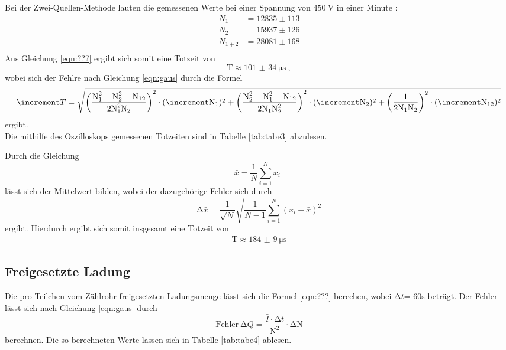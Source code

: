 Bei der Zwei-Quellen-Methode lauten die gemessenen Werte bei einer Spannung von
$\SI{450}{\volt}$ in einer Minute :
\begin{align*}
  N_1 &= 12835 \pm 113 \\
  N_2 &= 15937 \pm 126 \\
  N_{1+2} &= 28081 \pm 168 \\
\end{align*}
Aus Gleichung \ref{eqn:???} ergibt sich somit eine Totzeit von
\begin{equation*}
  \text{T} \approx \SI{101(34)}{\micro\second} \: ,
\end{equation*}
wobei sich der Fehlre nach Gleichung \ref{eqn:gaus} durch die Formel
\begin{equation}
  \increment T = \sqrt{\left( \frac{\text{N}_{1}^2-\text{N}_{2}^2-\text{N}_{12}}{2\text{N}_{1}^2\text{N}_{2}} \right)^2 \cdot (\increment \text{N}_{1})^2 \\
   + \left( \frac{\text{N}_{2}^2-\text{N}_{1}^2-\text{N}_{12}}{2\text{N}_{1}\text{N}_{2}^2} \right)^2 \cdot (\increment \text{N}_{2})^2
  +\left( \frac{1}{2\text{N}_{1}\text{N}_{2}} \right)^2 \cdot (\increment \text{N}_{12})^2 }
\end{equation}
ergibt. \\
Die mithilfe des Oszilloskops gemessenen Totzeiten sind in Tabelle \ref{tab:tabe3}
abzulesen.

Durch die Gleichung
\begin{equation}
  \bar{x} = \frac{1}{N} \sum_{i=1}^{N} x_i \: \:
  \label{eqn:mit}
\end{equation}
\noindent lässt sich der Mittelwert bilden, wobei der dazugehörige Fehler sich durch
\begin{equation}
  \increment \bar{x} = \frac{1}{\sqrt{N}} \sqrt{ \frac{1}{N-1} \sum_{i=1}^N
  (x_i - \bar{x})^2}
  \label{eqn:mitf}
\end{equation}
ergibt. Hierdurch ergibt sich somit insgesamt eine Totzeit von
\begin{align*}
  \text{T} \approx \SI{184(9)}{\micro\second}
\end{align*}
\subsection{Freigesetzte Ladung}
Die pro Teilchen vom Zählrohr freigesetzten Ladungsmenge lässt sich die Formel
\ref{eqn:???} berechen, wobei $\increment t$= 60s beträgt. Der Fehler lässt sich nach Gleichung \ref{eqn:gaus} durch
\begin{equation}
   \text{Fehler} \: \increment Q = \frac{\bar{I} \cdot \increment t}{\text{N}^2} \cdot \increment \text{N}
\end{equation}
berechnen.
Die so berechneten Werte lassen sich in Tabelle \ref{tab:tabe4} ablesen.

